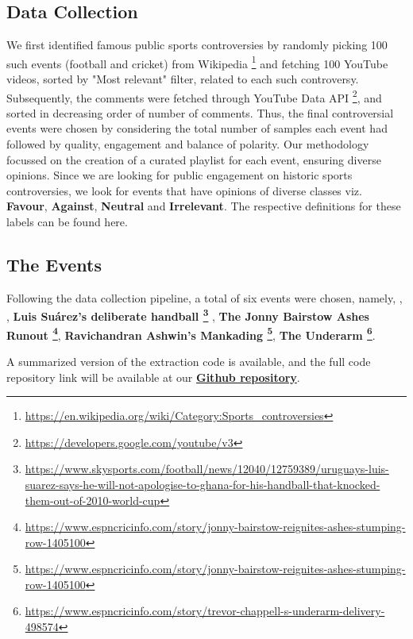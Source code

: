 \documentclass[sigconf, review]{acmart}
\begin{document}
\subsection{Data Collection}

We first identified famous public sports controversies by randomly picking 100 such events (football and cricket) from Wikipedia \footnote{\url{https://en.wikipedia.org/wiki/Category:Sports_controversies}} 
 and fetching 100 YouTube videos, sorted by "Most relevant" filter, related to each such controversy. Subsequently, the comments were fetched through YouTube Data API \footnote{\url{https://developers.google.com/youtube/v3}}, and sorted in decreasing order of number of comments. Thus, the final controversial events were chosen by considering the total number of samples each event had followed by quality, engagement and balance of polarity. Our methodology focussed on the creation of a curated playlist for each event, ensuring diverse opinions. Since we are looking for public engagement on historic sports controversies, we look for events that have opinions of diverse classes viz. {\bf Favour}, {\bf Against}, {\bf Neutral} and {\bf Irrelevant}. The respective definitions for these labels can be found here.

\subsection{The Events}

Following the data collection pipeline, a total of six events were chosen, namely, , , {\bf Luis Suárez's deliberate handball \footnote{\url{https://www.skysports.com/football/news/12040/12759389/uruguays-luis-suarez-says-he-will-not-apologise-to-ghana-for-his-handball-that-knocked-them-out-of-2010-world-cup}} }, {\bf The Jonny Bairstow Ashes Runout \footnote{\url{https://www.espncricinfo.com/story/jonny-bairstow-reignites-ashes-stumping-row-1405100}}}, {\bf Ravichandran Ashwin's Mankading \footnote{\url{https://www.espncricinfo.com/story/jonny-bairstow-reignites-ashes-stumping-row-1405100}}}, {\bf The Underarm \footnote{\url{https://www.espncricinfo.com/story/trevor-chappell-s-underarm-delivery-498574}}}.

A summarized version of the extraction code is available, and the full code repository link will be available at our \href{https://github.com/YuvrajSingh-mist/Public-Sports-Controversy/tree/master}{{\bf Github repository}}.
\end{document}

